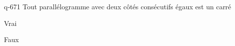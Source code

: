 \begin{truefalse}{q-671}
 Tout parallélogramme avec deux côtés consécutifs égaux est un carré
\item Vrai
\item* Faux
\end{truefalse}

